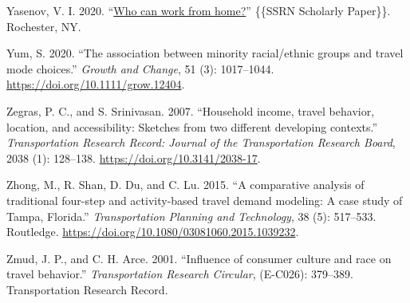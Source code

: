 \documentclass[fancy, twoside, mastersfancy, ms]{byuthesis}
\newlength{\cslhangindent}
\newenvironment{CSLReferences}[2] %
 {\begin{list}{}{%
  \setlength{\itemindent}{0pt}
  \setlength{\leftmargin}{0pt}
  \setlength{\parsep}{0pt}
  \ifodd #1
   \setlength{\leftmargin}{\cslhangindent}
   \setlength{\itemindent}{-1\cslhangindent}
  \fi
  \setlength{\itemsep}{#2\baselineskip}}}
 {\end{list}}
\begin{document}
\begin{CSLReferences}{1}{0}
Yasenov, V. I. 2020. {``\href{https://doi.org/10.2139/ssrn.3590895}{Who
can work from home?}''} \{\{SSRN Scholarly Paper\}\}. Rochester, NY.

Yum, S. 2020. {``The association between minority racial/ethnic groups
and travel mode choices.''} \emph{Growth and Change}, 51 (3):
1017--1044. \url{https://doi.org/10.1111/grow.12404}.

Zegras, P. C., and S. Srinivasan. 2007. {``Household income, travel
behavior, location, and accessibility: Sketches from two different
developing contexts.''} \emph{Transportation Research Record: Journal of
the Transportation Research Board}, 2038 (1): 128--138.
\url{https://doi.org/10.3141/2038-17}.

Zhong, M., R. Shan, D. Du, and C. Lu. 2015. {``A comparative analysis of
traditional four-step and activity-based travel demand modeling: A case
study of {Tampa}, {Florida}.''} \emph{Transportation Planning and
Technology}, 38 (5): 517--533. Routledge.
\url{https://doi.org/10.1080/03081060.2015.1039232}.

Zmud, J. P., and C. H. Arce. 2001. {``Influence of consumer culture and
race on travel behavior.''} \emph{Transportation Research Circular},
(E-C026): 379--389. Transportation Research Record.

\end{CSLReferences}
\end{document}
